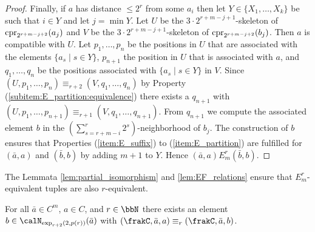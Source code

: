\begin{proof}
	
	Finally, if $a$ has distance $\leq 2^{r}$ from some $a_i$ then let $Y\in \{X_1,\ldots,X_k\}$ be such that $i\in Y$ and let $j=\min Y$. Let $U$ be the $3\cdot 2^{r+m-j+1}$-skeleton of $\operatorname{cpr}_{2^{r+m-j+2}}(a_j)$ and 
	$V$ be the $3\cdot 2^{r+m-j+1}$-skeleton of $\operatorname{cpr}_{2^{r+m-j+2}}(b_j)$.
	Then $a$ is compatible with $U$. Let $p_1,\ldots,p_n$ be the positions in $U$ that are associated with the elements $\{a_s \mid s\in Y\}$, $p_{n+1}$ the position in $U$ that is associated with $a$, and $q_1,\ldots,q_n$ be the positions associated with  $\{a_s \mid s\in Y\}$ in $V$. Since $(U,p_1,\ldots,p_n) \equiv_{r+2} (V,q_1,\ldots,q_n)$ by Property (\ref{subitem:E_partition:equivalence}) there exists a $q_{n+1}$ with $(U,p_1,\ldots,p_{n+1}) \equiv_{r+1} (V,q_1,\ldots,q_{n+1})$. From $q_{n+1}$ we compute the associated element $b$
	in the  $(\sum_{s= r+m-i}^{r} 2^s)$-neighborhood of $b_j$.	
	The construction of $b$ ensures that Properties (\ref{item:E_suffix}) to (\ref{item:E_partition}) are fulfilled for $(\bar{a}, a)$ and $(\bar{b}, b)$ by adding $m+1$ to $Y$. Hence $(\bar{a}, a) E^r_m (\bar{b}, b)$.   
\end{proof}

The Lemmata \ref{lem:partial_isomorphism} and \ref{lem:EF_relations} ensure that $E^r_m$-equivalent tuples are also $r$-equivalent.

\begin{corollary}\label{cor:equivalence}
	For all $\bar{a}\in C^m$, $a\in C$, and $r\in\bbN$ there exists an element $b\in \calN_{\exp_{r+2}(2,p(r))}(\bar{a})$ with $(\frakC, \bar{a}, a) \equiv_r (\frakC,\bar{a}, b)$.
\end{corollary}


